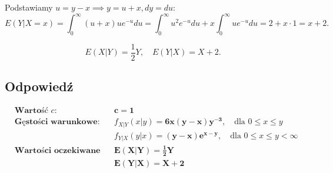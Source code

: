 Podstawiamy \(u = y-x \implies y = u+x, dy = du\):
\[
	E(Y|X=x) = \int_0^\infty (u+x) u e^{-u} du = \int_0^\infty u^2 e^{-u} du + x \int_0^\infty u e^{-u} du = 2 + x \cdot 1 = x + 2.
\]


\[
	E(X|Y) = \frac{1}{2}Y, \quad E(Y|X) = X+2.
\]

\subsection*{Odpowiedź}
\[
	\boxed{
		\begin{aligned}
			 & \textbf{Wartość } c\textbf{:}           &  & \mathbf{c = 1}                                                                       \\
			 & \textbf{Gęstości warunkowe:}            &  & f_{X|Y}(x | y) = \mathbf{6x(y - x)y^{-3}}, \quad \text{dla } 0 \le x \le y           \\
			 &                                         &  & f_{Y|X}(y | x) = \mathbf{(y - x)e^{x - y}}, \quad \text{dla } 0 \le x \le y < \infty \\
			 & \textbf{Wartości oczekiwane warunkowe:} &  & \mathbf{E(X | Y) = \frac{1}{2}Y}                                                     \\
			 &                                         &  & \mathbf{E(Y | X) = X + 2}
		\end{aligned}
	}
\]
